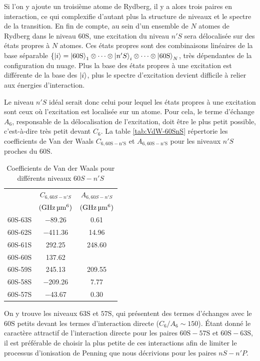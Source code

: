 Si l'on y ajoute un troisième atome de Rydberg, il y a alors trois paires en interaction, ce qui complexifie d'autant plus la structure de niveaux et le spectre de la transition.
En fin de compte, au sein d'un ensemble de $N$ atomes de Rydberg dans le niveau $\mathrm{60S}$, une  excitation du niveau $n'S$ sera délocalisée sur des états propres à $N$ atomes.
Ces états propres sont des combinaisons linéaires de la base séparable $\{\ket{i} = 
\ket{\mathrm{60S}}_1\otimes\dots\otimes\ket{n'S}_i\otimes\dots\otimes\ket{\mathrm{60S}}_N$,
très dépendantes de la configuration du nuage.
Plus la base des états propres à une excitation est différente de la base des $\ket{i}$, plus le spectre d'excitation devient difficile à relier aux énergies d'interaction.

Le niveau $n'S$ idéal serait donc celui pour lequel les états propres à une excitation sont ceux où l'excitation est localisée sur un atome.
Pour cela, le terme d'échange $A_6$, responsable de la délocalisation de l'excitation, doit être le plus petit possible, c'est-à-dire très petit devant $C_6$.
La table \eqref{tab:VdW-60SnS} répertorie les coefficients de Van der Waals $C_{6,\mathrm{60S-n'S}}$ et $A_{6,\mathrm{60S-n'S}}$ pour les niveaux $n'S$ proches du $\mathrm{60S}$.
%
\begin{table}[!h]
	\centering
	\caption[Coefficients de Van der Waals pour différents niveaux $60S-n'S$]{Coefficients de Van der Waals pour différents niveaux $60S-n'S$
	}
	\label{tab:VdW-60SnS}
	\begin{tabular}{c c c}
		\toprule\midrule
		~
		& $C_{6,60S-n'S}$
		& $A_{6,60S-n'S}$\\		
		~
		& $(\si{\GHz\raiseto{6}\um})$
		& $(\si{\GHz\raiseto{6}\um})$\\
		\midrule
		60S-63S & \SI{-89.26}{} & \SI{0.61}{} \\
		60S-62S & \SI{-411.36}{} & \SI{14.96}{} \\
		60S-61S & \SI{292.25}{} & \SI{248.60}{} \\
		60S-60S & \SI{137.62}{} & \SI{}{} \\
		60S-59S & \SI{245.13}{} & \SI{209.55}{} \\
		60S-58S & \SI{-209.26}{} & \SI{7.77}{} \\
		60S-57S & \SI{-43.67}{} & \SI{0.30}{} \\
		\midrule
		\bottomrule
 	\end{tabular}
\end{table}
%
On y trouve les niveaux $\mathrm{63S}$ et $\mathrm{57S}$, qui présentent des termes d'échanges avec le $\mathrm{60S}$ petits devant les termes d'interaction directe ($C_6 / A_6 \sim 150$).
Étant donné le caractère attractif de l'interaction directe pour les paires $\mathrm{60S-57S}$ et $\mathrm{60S-63S}$, il est préférable de choisir la plus petite de ces interactions afin de limiter le processus d'ionisation de Penning que nous décrivions pour les paires $nS-n'P$.

